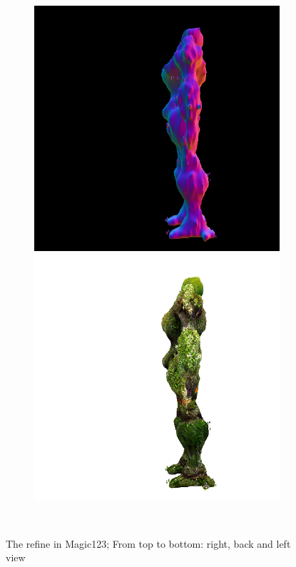 \begin{figure}[ht]
\begin{subfigure}[b]{0.222\textwidth}
        \includegraphics[width=\textwidth]{figures/appendix/magic123_refine_robot_left_10000_part2.png}
        \includegraphics[width=\textwidth]{figures/appendix/magic123_refine_robot_left_10000_part1.png}
        \caption{}
    \end{subfigure}
    \caption{The refine in Magic123; From top to bottom: right, back and left view}~\label{fig:generationRefineMagic123}
\end{figure}



